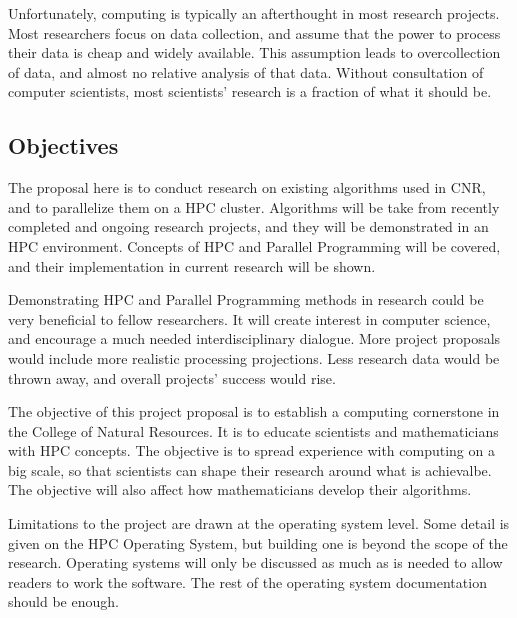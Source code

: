 Unfortunately, computing is typically an afterthought in most research projects.
Most researchers focus on data collection, and assume that the power to
process their data is cheap and widely available. This assumption leads to 
overcollection of data, and almost no relative analysis of that data. Without
consultation of computer scientists, most scientists' research is a fraction of
what it should be.

\subsection{Objectives}

The proposal here is to conduct research on existing algorithms used in 
CNR, and to parallelize them on a HPC cluster. Algorithms will be take from 
recently completed and ongoing research projects, and they will be demonstrated
in an HPC environment. Concepts of HPC and Parallel Programming will be covered,
and their implementation in current research will be shown.

Demonstrating HPC and Parallel Programming methods in research could be very 
beneficial to fellow researchers. It will create interest in computer science,
and encourage a much needed interdisciplinary dialogue. More project proposals 
would include more realistic processing projections. Less research data would be
thrown away, and overall projects' success would rise.

The objective of this project proposal is to establish a computing cornerstone
in the College of Natural Resources. It is to educate scientists and 
mathematicians with HPC concepts. The objective is to spread experience with 
computing on a big scale, so that scientists can shape their research around
what is achievalbe. The objective will also affect how mathematicians develop 
their algorithms.

Limitations to the project are drawn at the operating system level. Some detail
is given on the HPC Operating System, but building one is beyond the scope of 
the research. Operating systems will only be discussed as much as is needed
to allow readers to work the software. The rest of the operating system 
documentation should be enough.



